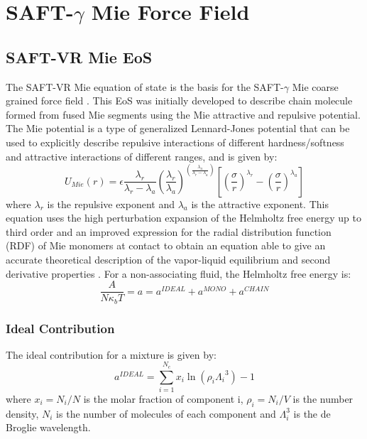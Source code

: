 \section{SAFT-$\gamma$ Mie Force Field}


\subsection{SAFT-VR Mie EoS}

The SAFT-VR Mie equation of state \cite{lafitte2013} is the basis for the SAFT-$\gamma$ Mie coarse grained force field \cite{avendano2011}. This EoS was initially developed to describe chain molecule formed from fused Mie segments using the Mie attractive and repulsive potential. The Mie potential is a type of generalized Lennard-Jones potential that can be used to explicitly describe repulsive interactions of different hardness/softness and attractive interactions of different ranges, and is given by:
\begin{equation}
U_{Mie}(r) = \epsilon\frac{\lambda_r}{\lambda_r - \lambda_a} \left(\frac{\lambda_r}{\lambda_a} \right)^{\left( \frac{\lambda_a}{\lambda_r - \lambda_a} \right)}
\left[ \left(\frac{\sigma}{r} \right)^{\lambda_r} - \left(\frac{\sigma}{r} \right)^{\lambda_a} \right]
\label{eqn:miepotential}
\end{equation}
where $\lambda_r$ is the repulsive exponent and $\lambda_a$ is the attractive exponent. This equation uses the  high perturbation expansion of the Helmholtz free energy up to third order and an improved expression for the  radial distribution function (RDF) of Mie monomers at contact to obtain an equation able to give an accurate theoretical description of the vapor-liquid equilibrium and second derivative properties \cite{lafitte2013}. For a non-associating fluid, the Helmholtz free energy is:
\begin{equation}
\frac{A}{N\kappa_{b}T} = a = a^{IDEAL} + a^{MONO} + a^{CHAIN}
\label{eqn:miehelm}
\end{equation}

\subsubsection{Ideal Contribution}

The ideal contribution for a mixture is given by:
\begin{equation}
a^{IDEAL} = \sum_{i=1}^{N_{c}} x_{i}\ln{(\rho_{i}{\Lambda_{i}}^3)} -1
\label{eqn:aideal}
\end{equation}
where $x_{i}=N_{i}/N$ is the molar fraction of component i, $\rho_{i}=N_{i}/V$ is the number density, $N_{i}$ is the number of molecules of each component and $\Lambda_{i}^3$ is the de Broglie wavelength. 

